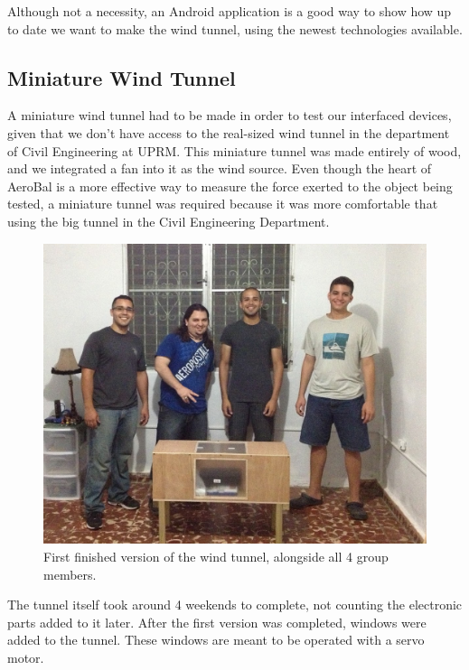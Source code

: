 		Although not a necessity, an Android application is a good way to show how up to date we want to make the wind tunnel, using the newest technologies available. 
		
		\subsection{Miniature Wind Tunnel}
		
		A miniature wind tunnel had to be made in order to test our interfaced devices, given that we don't have access to the real-sized wind tunnel in the department of Civil Engineering at UPRM. This miniature tunnel was made entirely of wood, and we integrated a fan into it as the wind source. Even though the heart of AeroBal is a more effective way to measure the force exerted to the object being tested, a miniature tunnel was required because it was more comfortable that using the big tunnel in the Civil Engineering Department.
		
		\begin{figure}[H]
			\centering
				\includegraphics[scale=0.3]{img/GroupPhoto}
			\caption{First finished version of the wind tunnel, alongside all 4 group members.}
		\end{figure}
		
		The tunnel itself took around 4 weekends to complete, not counting the electronic parts added to it later. After the first version was completed, windows were added to the tunnel. These windows are meant to be operated with a servo motor. 
		
